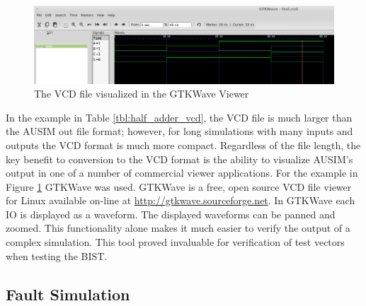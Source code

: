 \documentclass[12pt]{report}
\begin{document}
\begin{figure}
	\begin{center}
		\includegraphics[scale=.4]{images/half-adder-vcd}
	\end{center}
	\caption{The VCD file visualized in the GTKWave Viewer}
	\label{fig:half-adder-gtkwave}
\end{figure}
In the example in Table \ref{tbl:half_adder_vcd}, the VCD file is much larger than the AUSIM out file format; however, for long simulations with many inputs and outputs the VCD format is much more compact.  Regardless of the file length, the key benefit to conversion to the VCD format is the ability to visualize AUSIM's output in one of a number of commercial viewer applications.  For the example in Figure \ref{fig:half-adder-gtkwave} GTKWave was used.  GTKWave is a free, open source VCD file viewer for Linux available on-line at \url{http://gtkwave.sourceforge.net}.  In GTKWave each IO is displayed as a waveform.  The displayed waveforms can be panned and zoomed.  This functionality alone makes it much easier to verify the output of a complex simulation.  This tool proved invaluable for verification of test vectors when testing the BIST.
 
\subsection{Fault Simulation}
\end{document}
